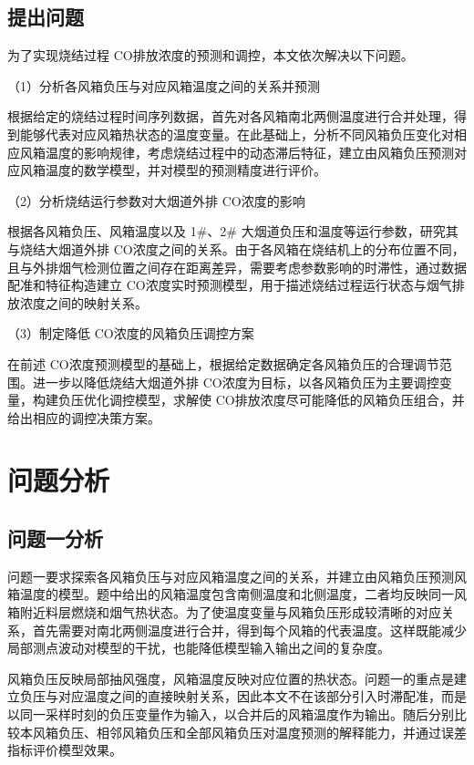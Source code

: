 \documentclass[UTF8,a4paper,zihao=-4]{ctexart}
\newcommand{\CO}{CO}
\begin{document}
\subsection{提出问题}

为了实现烧结过程 \CO 排放浓度的预测和调控，本文依次解决以下问题。

（1）分析各风箱负压与对应风箱温度之间的关系并预测

根据给定的烧结过程时间序列数据，首先对各风箱南北两侧温度进行合并处理，得到能够代表对应风箱热状态的温度变量。在此基础上，分析不同风箱负压变化对相应风箱温度的影响规律，考虑烧结过程中的动态滞后特征，建立由风箱负压预测对应风箱温度的数学模型，并对模型的预测精度进行评价。

（2）分析烧结运行参数对大烟道外排 \CO 浓度的影响

根据各风箱负压、风箱温度以及 1\#、2\# 大烟道负压和温度等运行参数，研究其与烧结大烟道外排 \CO 浓度之间的关系。由于各风箱在烧结机上的分布位置不同，且与外排烟气检测位置之间存在距离差异，需要考虑参数影响的时滞性，通过数据配准和特征构造建立 \CO 浓度实时预测模型，用于描述烧结过程运行状态与烟气排放浓度之间的映射关系。

（3）制定降低 \CO 浓度的风箱负压调控方案

在前述 \CO 浓度预测模型的基础上，根据给定数据确定各风箱负压的合理调节范围。进一步以降低烧结大烟道外排 \CO 浓度为目标，以各风箱负压为主要调控变量，构建负压优化调控模型，求解使 \CO 排放浓度尽可能降低的风箱负压组合，并给出相应的调控决策方案。

\section{问题分析}

\subsection{问题一分析}

问题一要求探索各风箱负压与对应风箱温度之间的关系，并建立由风箱负压预测风箱温度的模型。题中给出的风箱温度包含南侧温度和北侧温度，二者均反映同一风箱附近料层燃烧和烟气热状态。为了使温度变量与风箱负压形成较清晰的对应关系，首先需要对南北两侧温度进行合并，得到每个风箱的代表温度。这样既能减少局部测点波动对模型的干扰，也能降低模型输入输出之间的复杂度。

风箱负压反映局部抽风强度，风箱温度反映对应位置的热状态。问题一的重点是建立负压与对应温度之间的直接映射关系，因此本文不在该部分引入时滞配准，而是以同一采样时刻的负压变量作为输入，以合并后的风箱温度作为输出。随后分别比较本风箱负压、相邻风箱负压和全部风箱负压对温度预测的解释能力，并通过误差指标评价模型效果。
\end{document}
